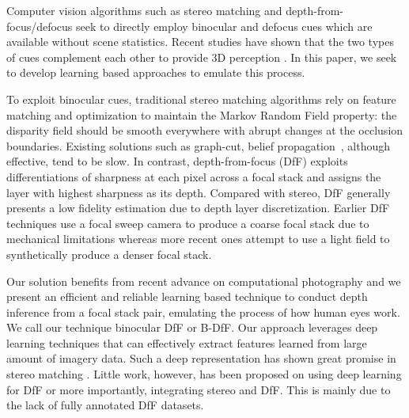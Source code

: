\documentclass[10pt,twocolumn,letterpaper]{article}
\begin{document}
Computer vision algorithms such as stereo matching \cite{scharstein02, brown03} and depth-from-focus/defocus \cite{nayar92, nayar94, malik07, favaro05, favaro07} seek to directly employ binocular and defocus cues which are available without scene statistics. Recent studies have shown that the two types of cues complement each other to provide 3D perception \cite{held12}. In this paper, we seek to develop learning based approaches to emulate this process.

To exploit binocular cues, traditional stereo matching algorithms rely on feature matching and optimization to maintain the Markov Random Field property: the disparity field should be smooth everywhere with abrupt changes at the occlusion boundaries. Existing solutions such as graph-cut, belief propagation~\cite{kolmogorov02, sun03}, although effective, tend to be slow. In contrast, depth-from-focus (DfF) exploits differentiations of sharpness at each pixel across a focal stack and assigns the layer with highest sharpness as its depth. Compared with stereo, DfF generally presents a low fidelity estimation due to depth layer discretization. Earlier DfF techniques use a focal sweep camera to produce a coarse focal stack due to mechanical limitations whereas more recent ones attempt to use a light field to synthetically produce a denser focal stack.

Our solution benefits from recent advance on computational photography and we present an efficient and reliable learning based technique to conduct depth inference from a focal stack pair, emulating the process of how human eyes work. We call our technique binocular DfF or B-DfF. Our approach leverages deep learning techniques that can effectively extract features learned from large amount of imagery data. Such a deep representation has shown great promise in stereo matching \cite{zbontar15, zagoruyko15, luo16}. Little work, however, has been proposed on using deep learning for DfF or more importantly, integrating stereo and DfF. This is mainly due to the lack of fully annotated DfF datasets.
\end{document}
